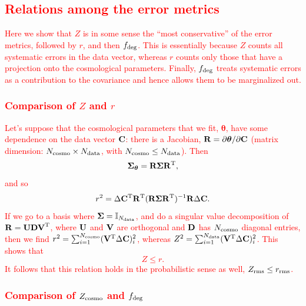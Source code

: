 \documentclass[usenatbib]{mnras}
\newcommand{\changetext}[1]{\textcolor{red}{#1}}
\begin{document}
\subsection{\changetext{Relations among the error metrics}}

\changetext{Here we show that $Z$ is in some sense the ``most conservative'' of the error metrics, followed by $r$, and then $f_{\rm deg}$. This is essentially because $Z$ counts all systematic errors in the data vector, whereas $r$ counts only those that have a projection onto the cosmological parameters. Finally, $f_{\rm deg}$ treats systematic errors as a contribution to the covariance and hence allows them to be marginalized out.}

\subsubsection{\changetext{Comparison of $Z$ and $r$}}

\changetext{Let's suppose that the cosmological parameters that we fit, ${\boldsymbol\theta}$, have some dependence on the data vector ${\bf C}$: there is a Jacobian, ${\bf R} = \partial {\boldsymbol\theta}/\partial{\bf C}$ (matrix dimension: $N_{\rm cosmo}\times N_{\rm data}$, with $N_{\rm cosmo}\le N_{\rm data}$). Then
\begin{equation}
{\boldsymbol\Sigma}_{\boldsymbol\theta} = {\bf R}{\boldsymbol\Sigma}{\bf R}^{\rm T},
\end{equation}
and so
\begin{equation}
r^2 = \Delta{\bf C}^{\rm T}{\bf R}^{\rm T} ({\bf R}{\boldsymbol\Sigma}{\bf R}^{\rm T})^{-1} {\bf R}\Delta{\bf C}.
\end{equation}
If we go to a basis where ${\boldsymbol\Sigma} = {\mathbb I}_{N_{\rm data}}$, and do a singular value decomposition of ${\bf R} = {\bf UDV}^{\rm T}$, where ${\bf U}$ and ${\bf V}$ are orthogonal and ${\bf D}$ has $N_{\rm cosmo}$ diagonal entries, then we find $r^2 = \sum_{i=1}^{N_{\rm cosmo}} ({\bf V}^{\rm T}\Delta{\bf C})_i^2$, whereas $Z^2 = \sum_{i=1}^{N_{\rm data}} ({\bf V}^{\rm T}\Delta{\bf C})_i^2$. This shows that
\begin{equation}
Z \le r.
\label{eq:ZZC}
\end{equation}
It follows that this relation holds in the probabilistic sense as well, $Z_{\rm rms}\le r_{\rm rms}$.
}

\subsubsection{\changetext{Comparison of $Z_{\rm cosmo}$ and $f_{\rm deg}$}}
\label{ss:czf}
\end{document}
